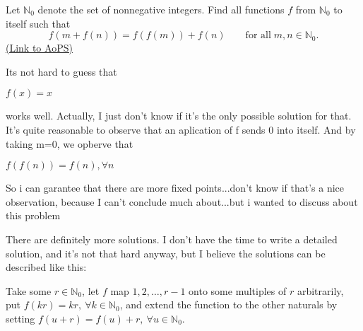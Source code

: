 \begin{problem}
	Let $ \mathbb{N}_0$ denote the set of nonnegative integers. Find all  functions $ f$ from $ \mathbb{N}_0$ to itself such that
\[ f(m + f(n)) = f(f(m)) + f(n)\qquad \text{for all} \; m, n \in \mathbb{N}_0.
\]
	\flushright \href{https://artofproblemsolving.com/community/c6h60429}{(Link to AoPS)}
\end{problem}



\begin{solution}
	Its not hard to guess that 

$f(x)=x$

works well. Actually, I just don't know if it's the only possible solution for that. It's quite reasonable to observe that an aplication of f sends 0 into itself. And by taking m=0, we opberve that

$f(f(n))=f(n), \forall n$

So i can garantee that there are more fixed points...don't know if that's a nice observation, because I can't conclude much about...but i wanted to discuss about this problem
\end{solution}



\begin{solution}
	There are definitely more solutions. I don't have the time to write a detailed solution, and it's not that hard anyway, but I believe the solutions can be described like this: 

Take some $r\in\mathbb N_0$, let $f$ map $1,2,\ldots,r-1$ onto some multiples of $r$ arbitrarily, put $f(kr)=kr,\ \forall k\in\mathbb N_0$, and extend the function to the other naturals by setting $f(u+r)=f(u)+r,\ \forall u\in\mathbb N_0$.
\end{solution}



